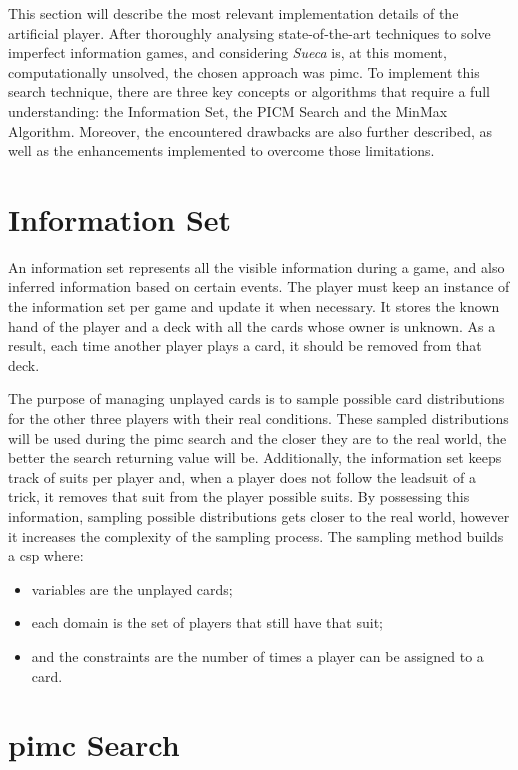\label{chapter:artificial-player}

This section will describe the most relevant implementation details of the artificial player.
After thoroughly analysing state-of-the-art techniques to solve imperfect information games, and considering \emph{Sueca} is, at this moment, computationally unsolved, the chosen approach was \ac{pimc}.
To implement this search technique, there are three key concepts or algorithms that require a full understanding: the Information Set, the PICM Search and the MinMax Algorithm.
Moreover, the encountered drawbacks are also further described, as well as the enhancements implemented to overcome those limitations.

\section*{Information Set}

An information set represents all the visible information during a game, and also inferred information based on certain events.
The player must keep an instance of the information set per game and update it when necessary.
It stores the known hand of the player and a deck with all the cards whose owner is unknown.
As a result, each time another player plays a card, it should be removed from that deck.

The purpose of managing unplayed cards is to sample possible card distributions for the other three players with their real conditions.
These sampled distributions will be used during the \ac{pimc} search and the closer they are to the real world, the better the search returning value will be.
Additionally, the information set keeps track of suits per player and, when a player does not follow the leadsuit of a trick, it removes that suit from the player possible suits.
By possessing this information, sampling possible distributions gets closer to the real world, however it increases the complexity of the sampling process.
The sampling method builds a \ac{csp} where:
\begin{itemize}
\item variables are the unplayed cards;
\item each domain is the set of players that still have that suit;
\item and the constraints are the number of times a player can be assigned to a card.
\end{itemize}


\section*{\ac{pimc} Search}

